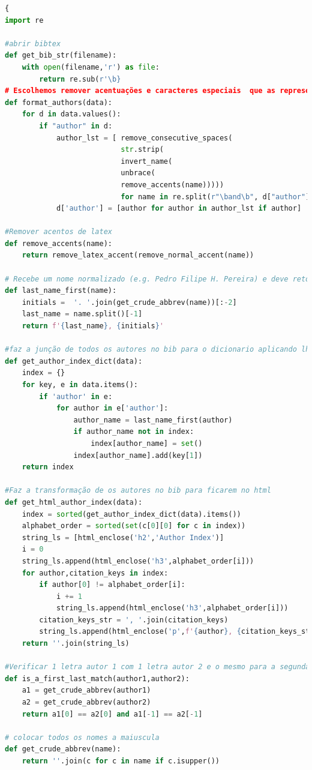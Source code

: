 \documentclass[11pt,a4paper]{report}
\begin{document}
\begin{lstlisting}[language=python]{
import re

#abrir bibtex
def get_bib_str(filename):
    with open(filename,'r') as file:
        return re.sub(r'\b}
# Escolhemos remover acentuações e caracteres especiais  que as representam em latex (e.g. "\\~") do nome dos autores.
def format_authors(data):
    for d in data.values():
        if "author" in d:
            author_lst = [ remove_consecutive_spaces(
                           str.strip(
                           invert_name(
                           unbrace(
                           remove_accents(name)))))
                           for name in re.split(r"\band\b", d["author"].replace("\n", " "))]
            d['author'] = [author for author in author_lst if author]

#Remover acentos de latex
def remove_accents(name):
    return remove_latex_accent(remove_normal_accent(name))

# Recebe um nome normalizado (e.g. Pedro Filipe H. Pereira) e deve retornar "invertido" (e.g. Pereira, P. F. H.)
def last_name_first(name):
    initials =  '. '.join(get_crude_abbrev(name))[:-2]
    last_name = name.split()[-1]
    return f'{last_name}, {initials}'

#faz a junção de todos os autores no bib para o dicionario aplicando lhe um primeiro filtro
def get_author_index_dict(data):
    index = {}
    for key, e in data.items():
        if 'author' in e:
            for author in e['author']:
                author_name = last_name_first(author)
                if author_name not in index:
                    index[author_name] = set()
                index[author_name].add(key[1])
    return index

#Faz a transformação de os autores no bib para ficarem no html
def get_html_author_index(data):
    index = sorted(get_author_index_dict(data).items())
    alphabet_order = sorted(set(c[0][0] for c in index))
    string_ls = [html_enclose('h2','Author Index')]
    i = 0
    string_ls.append(html_enclose('h3',alphabet_order[i]))
    for author,citation_keys in index:
        if author[0] != alphabet_order[i]:
            i += 1
            string_ls.append(html_enclose('h3',alphabet_order[i]))
        citation_keys_str = ', '.join(citation_keys)
        string_ls.append(html_enclose('p',f'{author}, {citation_keys_str}'))
    return ''.join(string_ls)

#Verificar 1 letra autor 1 com 1 letra autor 2 e o mesmo para a segunda
def is_a_first_last_match(author1,author2):
    a1 = get_crude_abbrev(author1)
    a2 = get_crude_abbrev(author2)
    return a1[0] == a2[0] and a1[-1] == a2[-1]

# colocar todos os nomes a maiuscula
def get_crude_abbrev(name):
    return ''.join(c for c in name if c.isupper())


\end{lstlisting}
\end{document}
